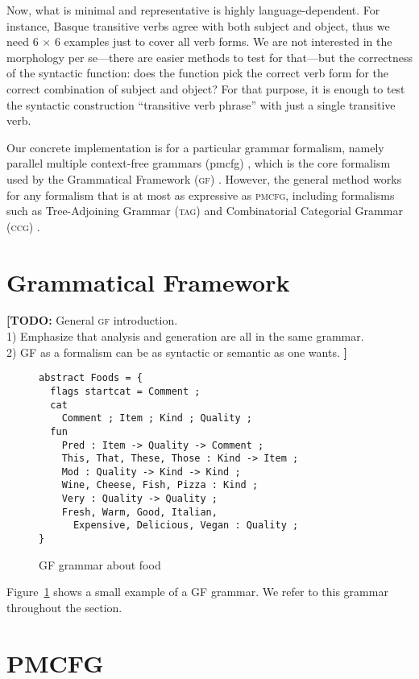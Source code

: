 \documentclass[runningheads]{llncs}
\def\gf{\textsc{gf}}
\def\ccg{\textsc{ccg}}
\def\tag{\textsc{tag}}
\def\pmcfg{\textsc{pmcfg}}
\newcommand{\todo}[1]{{\color{cyan}\textbf{[TODO: }#1\textbf{]}}}
\begin{document}
Now, what is minimal and representative is highly language-dependent. 
For instance, Basque transitive verbs agree with both subject and
object, thus we need 6 $\times$ 6 examples just to cover all verb
forms. We are not interested in the morphology per se---there are
easier methods to test for that---but the correctness of the syntactic
function: does the function pick the correct verb form for the correct
combination of subject and object? For that purpose, it is enough to
test the syntactic construction ``transitive verb phrase'' with just a
single transitive verb.

Our concrete implementation is for a particular grammar formalism,
namely parallel multiple context-free grammars ({\sc pmcfg})
\cite{seki91pmcfg}, which is the core formalism used by the
Grammatical Framework (\gf) \cite{ranta2004gf}. However, the general
method works for any formalism that is at most as expressive as
\pmcfg{}, including formalisms such as Tree-Adjoining Grammar (\tag)
\cite{joshi1975tag} and Combinatorial Categorial Grammar (\ccg)
\cite{steedman1988ccg}.

\section{Grammatical Framework}

\todo{General \gf{} introduction.\\
1) Emphasize that analysis and generation are all in the same
  grammar. \\ 2) GF as a formalism can be as syntactic or semantic as one wants.
}

\begin{figure}[h]
  \caption{GF grammar about food}
\label{fig:exampleGrammar}
\centering
    \begin{verbatim}
abstract Foods = {
  flags startcat = Comment ;
  cat
    Comment ; Item ; Kind ; Quality ;
  fun
    Pred : Item -> Quality -> Comment ;
    This, That, These, Those : Kind -> Item ;
    Mod : Quality -> Kind -> Kind ;
    Wine, Cheese, Fish, Pizza : Kind ;
    Very : Quality -> Quality ;
    Fresh, Warm, Good, Italian, 
      Expensive, Delicious, Vegan : Quality ;
}
    \end{verbatim}
\end{figure}

Figure~\ref{fig:exampleGrammar} shows a small example of a GF
grammar. We refer to this grammar throughout the section. 


\section{PMCFG}
\end{document}
